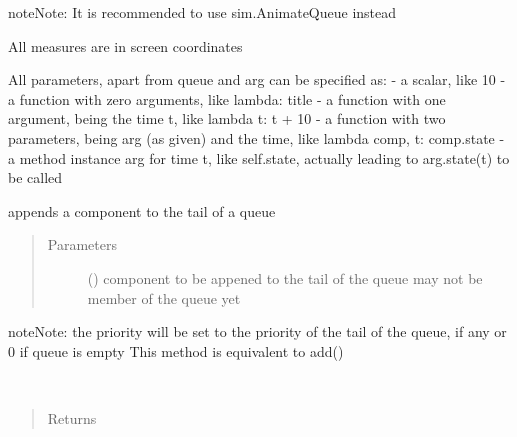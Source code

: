\documentclass[letterpaper,10pt,english]{sphinxmanual}
\begin{document}
\begin{fulllineitems}
\begin{fulllineitems}
\begin{sphinxadmonition}{note}{Note:}
It is recommended to use sim.AnimateQueue instead 

All measures are in screen coordinates 

All parameters, apart from queue and arg can be specified as: 
- a scalar, like 10 
- a function with zero arguments, like lambda: title 
- a function with one argument, being the time t, like lambda t: t + 10 
- a function with two parameters, being arg (as given) and the time, like lambda comp, t: comp.state 
- a method instance arg for time t, like self.state, actually leading to arg.state(t) to be called
\end{sphinxadmonition}

\end{fulllineitems}


\begin{fulllineitems}
\label{\detokenize{Reference:salabim.Queue.append}}
appends a component to the tail of a queue
\begin{quote}\begin{description}
\item[{Parameters}] \leavevmode
{} ({\hyperref[\detokenize{Reference:salabim.Component}]{}}) \textendash{} component to be appened to the tail of the queue 
may not be member of the queue yet

\end{description}\end{quote}

\begin{sphinxadmonition}{note}{Note:}
the priority will be set to
the priority of the tail of the queue, if any
or 0 if queue is empty 
This method is equivalent to add()
\end{sphinxadmonition}

\end{fulllineitems}


\begin{fulllineitems}
\label{\detokenize{Reference:salabim.Queue.base_name}}~\begin{quote}\begin{description}
\item[{Returns}] \leavevmode
{}


\end{description}
\end{quote}
\end{fulllineitems}
\end{fulllineitems}
\end{document}
